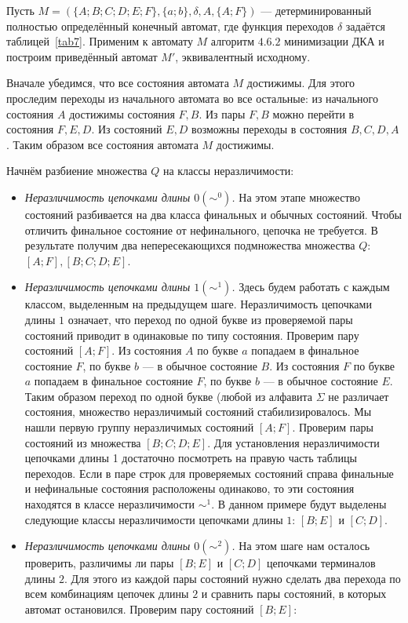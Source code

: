 \begin{myexample}
Пусть $M=(\{A;B;C;D;E;F\},\{a;b\},\delta,A,\{A;F\})$ --- детерминированный полностью определённый конечный автомат, где функция переходов $\delta$ задаётся таблицей~\ref{tab7}. Применим к автомату $M$ алгоритм $4.6.2$ минимизации ДКА и построим приведённый автомат $M'$, эквивалентный исходному.

Вначале убедимся, что все состояния автомата $M$ достижимы. Для этого проследим переходы из начального автомата во все остальные: из начального состояния $A$ достижимы состояния $F, B$. Из пары $F, B$ можно перейти в состояния $F, E, D$. Из состояний $E, D$ возможны переходы в состояния $B, C, D, A$. Таким образом все состояния автомата $M$ достижимы.

Начнём разбиение множества $Q$ на классы неразличимости:
\begin{itemize}
\item \textit{Неразличимость цепочками длины $0 (\sim^0)$.} На этом этапе множество состояний разбивается на два класса финальных и обычных состояний. Чтобы отличить финальное состояние от нефинального, цепочка не требуется. В результате получим два непересекающихся подмножества множества $Q$: $[A;F], [B;C;D;E]$.
\item \textit{Неразличимость цепочками длины $1 (\sim^1)$.} Здесь будем работать с каждым классом, выделенным на предыдущем шаге. Неразличимость цепочками длины $1$ означает, что переход по одной букве из проверяемой пары состояний приводит в одинаковые по типу состояния. Проверим пару состояний $[A;F]$. Из состояния $A$ по букве $a$ попадаем в финальное состояние $F$, по букве $b$ --- в обычное состояние $B$. Из состояния $F$ по букве $a$ попадаем в финальное состояние $F$, по букве $b$ --- в обычное состояние $E$. Таким образом переход по одной букве (любой из алфавита $\Sigma$ не различает состояния, множество неразличимый состояний стабилизировалось. Мы нашли первую группу неразличимых состояний $[A;F]$. Проверим пары состояний из множества $[B;C;D;E]$. Для установления неразличимости цепочками длины 1 достаточно посмотреть на правую часть таблицы переходов. Если в паре строк для проверяемых состояний справа финальные и нефинальные состояния расположены одинаково, то эти состояния находятся в классе неразличимости $\sim^1$. В данном примере будут выделены следующие классы неразличимости цепочками длины $1$: $[B;E]$ и $[C;D]$.
\item \textit{Неразличимость цепочками длины $0 (\sim^2)$.} На этом шаге нам осталось проверить, различимы ли пары  $[B;E]$ и $[C;D]$ цепочками терминалов длины $2$. Для этого из каждой пары состояний нужно сделать два перехода по всем комбинациям цепочек длины $2$ и сравнить пары состояний, в которых автомат остановился. Проверим пару состояний  $[B;E]$:

\end{itemize}
\end{myexample}

